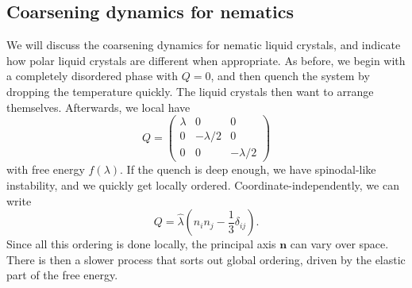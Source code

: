 \documentclass[a4paper]{article}
\begin{document}
\subsection{Coarsening dynamics for nematics}
We will discuss the coarsening dynamics for nematic liquid crystals, and indicate how polar liquid crystals are different when appropriate. As before, we begin with a completely disordered phase with $Q = 0$, and then quench the system by dropping the temperature quickly. The liquid crystals then want to arrange themselves. Afterwards, we local have
\[
  Q =
  \begin{pmatrix}
    \lambda & 0 & 0\\
    0 & - \lambda/2 & 0\\
    0 & 0 & -\lambda/2
  \end{pmatrix}
\]
with free energy $f(\lambda)$. If the quench is deep enough, we have spinodal-like instability, and we quickly get locally ordered. Coordinate-independently, we can write
\[
  Q = \hat{\lambda} \left(n_i n_j - \frac{1}{3} \delta_{ij}\right).
\]
Since all this ordering is done locally, the principal axis $\mathbf{n}$ can vary over space. There is then a slower process that sorts out global ordering, driven by the elastic part of the free energy.

%
\end{document}
